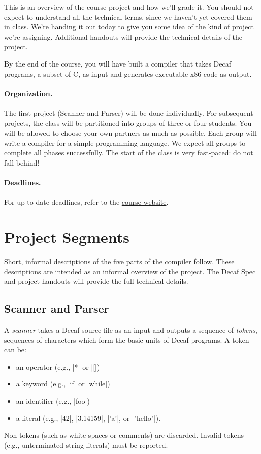 \documentclass[11pt]{article}
\begin{document}

This is an overview of the course project and how we'll grade it.
You should not expect to understand all the technical terms, since we haven't yet covered them in class.
We're handing it out today to give you some idea of the kind of project we're assigning.
Additional handouts will provide the technical details of the project.

By the end of the course, you will have built a compiler that takes Decaf programs, a subset of C, as input and generates executable x86 code as output.

\paragraph{Organization.}
The first project (Scanner and Parser) will be done individually.
For subsequent projects, the class will be partitioned into groups of three or four students.
You will be allowed to choose your own partners as much as possible.
Each group will write a compiler for a simple programming language.
We expect all groups to complete all phases successfully.
The start of the class is very fast-paced: do not fall behind!

\paragraph{Deadlines.}
For up-to-date deadlines, refer to the \href{https://github.com/6035-sp23/6035-sp23}{course website}.

\section{Project Segments}

Short, informal descriptions of the five parts of the compiler follow.
These descriptions are intended as an informal overview of the project.
The \href{https://github.com/6035-sp23/sp23/raw/main/materials/handouts/decaf-spec.pdf}{Decaf Spec} and project handouts will provide the full technical details.

\subsection{Scanner and Parser}

A \textit{scanner} takes a Decaf source file as an input and outputs a sequence of \textit{tokens}, sequences of characters which form the basic units of Decaf programs.
A token can be:
\begin{itemize}
\item an operator (e.g., \decaf|*| or \decaf|[|)
\item a keyword (e.g., \decaf|if| or \decaf|while|)
\item an identifier (e.g., \decaf|foo|)
\item a literal (e.g., \decaf|42|, \decaf|3.14159|, \decaf|'a'|, or \decaf|"hello"|).
\end{itemize}
Non-tokens (such as white spaces or comments) are discarded.
Invalid tokens (e.g., unterminated string literals) must be reported.
\end{document}
